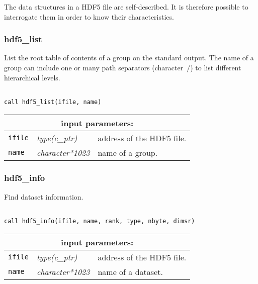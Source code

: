 The data structures in a HDF5 file are self-described. It is therefore possible to
interrogate them in order to know their characteristics.

\subsubsection{hdf5\_list}

List the root table of contents of a group on the standard output. The name of a group can include one or many path separators (character~$\slash$)
to list different hierarchical levels.

\begin{verbatim}

call hdf5_list(ifile, name)
\end{verbatim}

\noindent
\begin{tabular}{|p{1.5cm}|p{3cm}|p{10cm}|}
\hline
\multicolumn{3}{|c|}{\bf input parameters:} \\
\hline
{\tt ifile} & {\it type(c\_ptr)} & address of the HDF5 file. \\
\hline
{\tt name} & {\it character*1023} & name of a group. \\
\hline
\end{tabular}

\subsubsection{hdf5\_info}

Find dataset information.

\begin{verbatim}

call hdf5_info(ifile, name, rank, type, nbyte, dimsr)
\end{verbatim}

\noindent
\begin{tabular}{|p{1.5cm}|p{3cm}|p{10cm}|}
\hline
\multicolumn{3}{|c|}{\bf input parameters:} \\
\hline
{\tt ifile} & {\it type(c\_ptr)} & address of the HDF5 file. \\
\hline
{\tt name} & {\it character*1023} & name of a dataset. \\
\hline
\end{tabular}

\vskip 0.8cm

